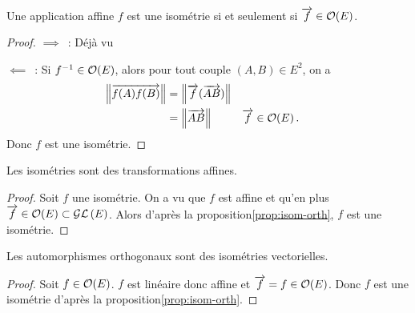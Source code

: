\begin{prop}
  \label{prop:isom-orth}
  Une application affine \(f\) est une isométrie si et seulement si \(\overrightarrow{f}
  \in \mathcal{O}\!\left(E\right)\).
\end{prop}
\begin{proof}
  \(\implies\)~: Déjà vu

  \(\impliedby\)~: Si \(f^{-1} \in \mathcal{O}\!\left(E\right)\), alors pour tout couple \((A,B)
  \in E^2\), on a
  \begin{align*}
    \left\lVert\overrightarrow{f(A)f(B)}\right\rVert &= \left\lVert\overrightarrow{f}(\overrightarrow{AB})\right\rVert \\
    &=\left\lVert\overrightarrow{AB}\right\rVert && \overrightarrow{f} \in \mathcal{O}\!\left(E\right).
  \end{align*}
  Donc \(f\) est une isométrie.
\end{proof}

\begin{prop}
  Les isométries sont des transformations affines.
\end{prop}
\begin{proof}
  Soit \(f\) une isométrie. On a vu que \(f\) est affine et qu'en plus
  \(\overrightarrow{f} \in \mathcal{O}\!\left(E\right) \subset \mathcal{GL}\left(E\right)\). Alors d'après la proposition\ref{prop:isom-orth}, \(f\) est une isométrie.
\end{proof}

\begin{prop}
  Les automorphismes orthogonaux sont des isométries vectorielles.
\end{prop}
\begin{proof}
  Soit \(f \in \mathcal{O}\!\left(E\right)\). \(f\) est linéaire donc affine et \(\overrightarrow{f}=f \in
  \mathcal{O}\!\left(E\right)\). Donc \(f\) est une isométrie d'après la proposition\ref{prop:isom-orth}.
\end{proof}

